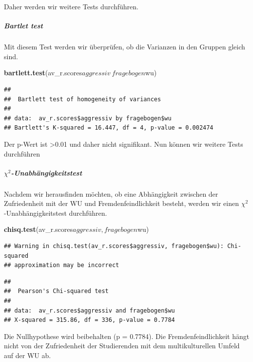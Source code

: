 \documentclass[]{article}
\newenvironment{Shaded}{\begin{snugshade}}{\end{snugshade}}
\newcommand{\KeywordTok}[1]{\textcolor[rgb]{0.13,0.29,0.53}{\textbf{{#1}}}}
\newcommand{\NormalTok}[1]{{#1}}
\let\oldsubparagraph\subparagraph
\renewcommand{\subparagraph}[1]{\oldsubparagraph{#1}\mbox{}}
\begin{document}
Daher werden wir weitere Tests durchführen.

\subparagraph{Bartlet test}\label{bartlet-test-1}

Mit diesem Test werden wir überprüfen, ob die Varianzen in den Gruppen
gleich sind.

\begin{Shaded}
\begin{Highlighting}[]
\KeywordTok{bartlett.test}\NormalTok{(av_r.scores$aggressiv~fragebogen$wu)}
\end{Highlighting}
\end{Shaded}

\begin{verbatim}
## 
##  Bartlett test of homogeneity of variances
## 
## data:  av_r.scores$aggressiv by fragebogen$wu
## Bartlett's K-squared = 16.447, df = 4, p-value = 0.002474
\end{verbatim}

Der p-Wert ist \textgreater{}0.01 und daher nicht signifikant. Nun
können wir weitere Tests durchführen

\subparagraph{\texorpdfstring{\(\chi^2\)-Unabhängigkeitstest}{\textbackslash{}chi\^{}2-Unabhängigkeitstest}}\label{chi2-unabhangigkeitstest-1}

Nachdem wir herausfinden möchten, ob eine Abhängigkeit zwischen der
Zufriedenheit mit der WU und Fremdenfeindlichkeit besteht, werden wir
einen \(\chi^2\)-Unabhängigkeitstest durchführen.

\begin{Shaded}
\begin{Highlighting}[]
\KeywordTok{chisq.test}\NormalTok{(av_r.scores$aggressiv,fragebogen$wu)}
\end{Highlighting}
\end{Shaded}

\begin{verbatim}
## Warning in chisq.test(av_r.scores$aggressiv, fragebogen$wu): Chi-squared
## approximation may be incorrect
\end{verbatim}

\begin{verbatim}
## 
##  Pearson's Chi-squared test
## 
## data:  av_r.scores$aggressiv and fragebogen$wu
## X-squared = 315.86, df = 336, p-value = 0.7784
\end{verbatim}

Die Nullhypothese wird beibehalten (p = 0.7784). Die
Fremdenfeindlichkeit hängt nicht von der Zufriedenheit der Studierenden
mit dem multikulturellen Umfeld auf der WU ab.
\end{document}
